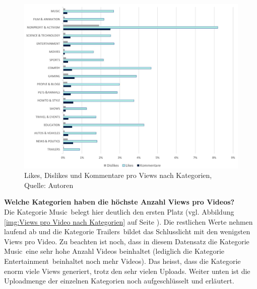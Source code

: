 \documentclass[12pt,titlepage]{article}
\begin{document}
\begin{figure}[h]
	\centering
	\includegraphics[width=14cm]{IMG/grafik_likesDislikesComments.JPG}
	\caption[Likes, Dislikes und Kommentare pro Views nach Kategorien]{Likes, Dislikes und Kommentare pro Views nach Kategorien,\\ Quelle: Autoren}
	\label{img:Likes, Dislikes und Kommentare pro Views nach Kategorien}
\end{figure}


\textbf{Welche Kategorien haben die höchste Anzahl Views pro Videos?}\\
Die Kategorie \glqq Music\grqq\, belegt hier deutlich den ersten Platz (vgl. Abbildung \ref{img:Views pro Video nach Kategorien} auf Seite \pageref{img:Views pro Video nach Kategorien}). Die restlichen Werte nehmen laufend ab und die Kategorie \glqq Trailers\grqq\, bildet das Schlusslicht mit den wenigsten Views pro Video. Zu beachten ist noch, dass in diesem Datensatz die Kategorie \glqq Music\grqq\, eine sehr hohe Anzahl Videos beinhaltet (lediglich die Kategorie \glqq Entertainment\grqq\, beinhaltet noch mehr Videos). Das heisst, dass die Kategorie enorm viele Views generiert, trotz den sehr vielen Uploads. Weiter unten ist die Uploadmenge der einzelnen Kategorien noch aufgeschlüsselt und erläutert.\\
\\
\end{document}

